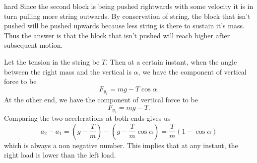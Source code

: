 \begin{solution}{hard}
Since the second block is being pushed rightwards with some velocity it is in turn pulling more string outwards. By conservation of string, the block that isn’t pushed will be pushed upwards because less string is there to sustain it’s mass. Thus the answer is that the block that isn’t pushed will reach higher after subsequent motion.

\tcbline

Let the tension in the string be $T$. Then at a certain instant, when the angle between the right mass and the vertical is $\alpha$, we have the component of vertical force to be 
\[F_{y_1} =  mg - T\cos\alpha.\]
At the other end, we have the component of vertical force to be 
\[F_{y_2} = mg - T.\]
Comparing the two accelerations at both ends gives us 
\[a_2 - a_1 = \left(g - \frac{T}{m}\right) - \left(g - \frac{T}{m}\cos\alpha\right) = \frac{T}{m}(1 - \cos\alpha)\]
which is always a non negative number. This implies that at any instant, the right load is lower than the left load.
\end{solution}

